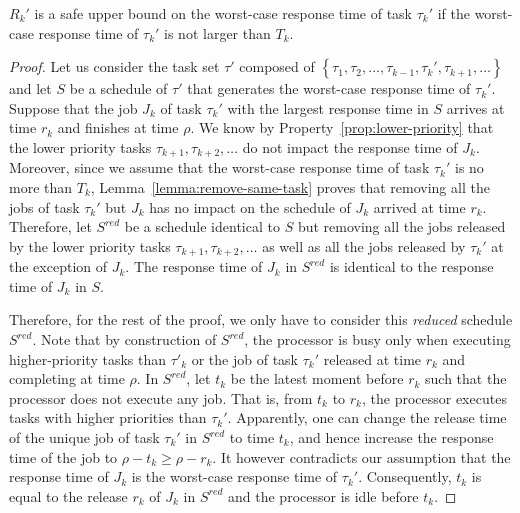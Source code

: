 \begin{theorem}
\label{theorem:critical}
 $R_k'$ is a safe upper bound on the worst-case response time of task $\tau_k'$ if the worst-case response time of $\tau_k'$ is not larger than $T_k$.
\end{theorem}
\begin{proof}
Let us consider the task set $\tau'$ composed of $\left\{\tau_1, \tau_2, \ldots, \tau_{k-1}, \tau_k', \tau_{k+1}, \ldots \right\}$ and let $S$ be a schedule of $\tau'$ that generates the worst-case response time of $\tau_k'$. Suppose that the job $J_{k}$ of task $\tau_k'$ with the largest response time in $S$ arrives at time $r_k$ and finishes at time $\rho$. We know by Property~\ref{prop:lower-priority} that the lower priority tasks $\tau_{k+1}, \tau_{k+2}, \ldots$ do not impact the response time of $J_{k}$. Moreover, since we assume that the worst-case response time of task $\tau_k'$ is no more than $T_k$, Lemma~\ref{lemma:remove-same-task} proves that removing all the jobs of task $\tau_k'$ but $J_{k}$ has no impact on the schedule of $J_{k}$ arrived at time $r_k$. Therefore, let $S^{red}$ be a schedule identical to $S$ but removing all the jobs released by the lower priority tasks $\tau_{k+1}, \tau_{k+2}, \ldots$ as well as all the jobs released by $\tau_k'$ at the exception of $J_{k}$. The response time of $J_{k}$ in $S^{red}$ is identical to the response time of $J_{k}$ in $S$.


Therefore, for the rest of the proof, we only have to consider this \emph{reduced} schedule $S^{red}$. Note that by construction of $S^{red}$, the processor is busy only when executing higher-priority tasks than $\tau'_k$ or the job of task $\tau_k'$ released at time $r_k$ and completing at time $\rho$. In $S^{red}$, let $t_{k}$ be the latest moment before $r_k$ such that the processor does not execute any job. That is, from $t_k$ to $r_k$, the processor executes tasks with higher priorities than $\tau_k'$. Apparently, one can change the release time of the unique job of task $\tau_k'$ in $S^{red}$ to time $t_k$, and hence increase the response time of the job to $\rho-t_k \geq \rho-r_k$. It however contradicts our assumption that the response time of $J_{k}$ is the worst-case response time of $\tau_k'$. Consequently, $t_k$ is equal to the release $r_k$ of $J_{k}$ in $S^{red}$ and the processor is idle before $t_k$.


\end{proof}
